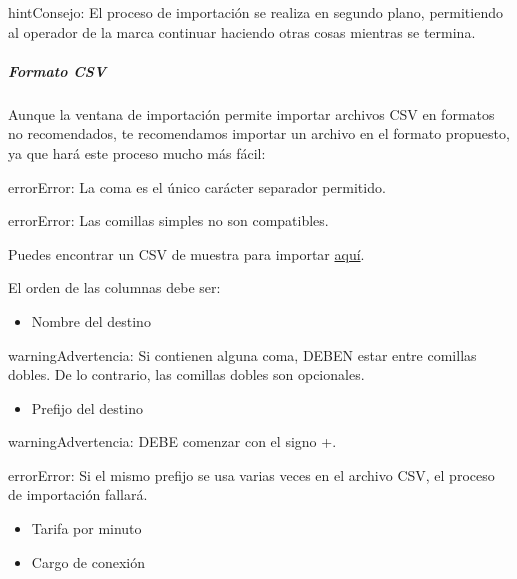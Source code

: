 \documentclass[letterpaper,10pt,spanish]{sphinxmanual}
\begin{document}
\begin{notice}{hint}{Consejo:}
El proceso de importación se realiza en segundo plano, permitiendo al operador de la marca continuar haciendo otras cosas mientras se termina.
\end{notice}


\subparagraph{Formato CSV}
\label{administration_portal/brand/billing/destination_rates:csv-format}
Aunque la ventana de importación permite importar archivos CSV en formatos no recomendados, te recomendamos importar un archivo en el formato propuesto, ya que hará este proceso mucho más fácil:

\begin{notice}{error}{Error:}
La coma es el único carácter separador permitido.
\end{notice}

\begin{notice}{error}{Error:}
Las comillas simples no son compatibles.
\end{notice}

Puedes encontrar un CSV de muestra para importar \href{https://raw.githubusercontent.com/irontec/ivozprovider/bleeding/web/portal/brand/samples/billing/pricesSample.csv}{aquí}.

El orden de las columnas debe ser:
\begin{itemize}
\item {} 
Nombre del destino

\end{itemize}

\begin{notice}{warning}{Advertencia:}
Si contienen alguna coma, DEBEN estar entre comillas dobles. De lo contrario, las comillas dobles son opcionales.
\end{notice}
\begin{itemize}
\item {} 
Prefijo del destino

\end{itemize}

\begin{notice}{warning}{Advertencia:}
DEBE comenzar con el signo +.
\end{notice}

\begin{notice}{error}{Error:}
Si el mismo prefijo se usa varias veces en el archivo CSV, el proceso de importación fallará.
\end{notice}
\begin{itemize}
\item {} 
Tarifa por minuto

\item {} 
Cargo de conexión

\end{itemize}
\end{document}
